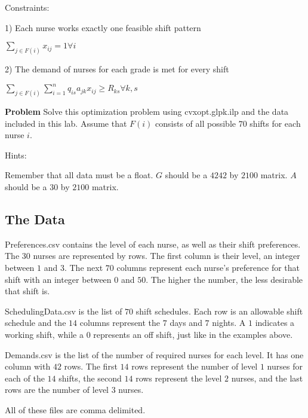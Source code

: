 Constraints:

1) Each nurse works exactly one feasible shift pattern
\begin{center}
$\displaystyle\sum_{j\in F(i)} x_{ij} = 1 \forall i$
\end{center}

2) The demand of nurses for each grade is met for every shift
\begin{center}
$\displaystyle\sum_{j\in F(i)} \displaystyle\sum_{i=1}^n q_{is}a_{jk}x_{ij} \geq R_{ks} \forall k,s$
\end{center}


\textbf{Problem}
Solve this optimization problem using cvxopt.glpk.ilp and the data included in this lab.
Assume that $F(i)$ consists of all possible $70$ shifts for each nurse $i$. 

Hints: 

Remember that all data must be a float. 
$G$ should be a $4242$ by $2100$ matrix.
$A$ should be a $30$ by $2100$ matrix.


\subsection*{The Data}
Preferences.csv contains the level of each nurse, as well as their shift preferences.
The $30$ nurses are represented by rows.
The first column is their level, an integer between $1$ and $3$.
The next $70$ columns represent each nurse's preference for that shift with an integer between $0$ and $50$.
The higher the number, the less desirable that shift is. 

SchedulingData.csv is the list of $70$ shift schedules.
Each row is an allowable shift schedule and the $14$ columns represent the $7$ days and $7$ nights.
A $1$ indicates a working shift, while a $0$ represents an off shift, just like in the examples above.

Demands.csv is the list of the number of required nurses for each level.
It has one column with $42$ rows.
The first $14$ rows represent the number of level $1$ nurses for each of the $14$ shifts, the second $14$ rows represent the level $2$ nurses, and the last rows are the number of level $3$ nurses. 

All of these files are comma delimited.

